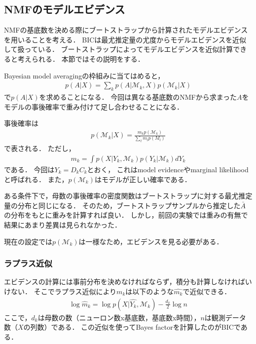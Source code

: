 \subsection{NMFのモデルエビデンス}
NMFの基底数を決める際にブートストラップから計算されたモデルエビデンスを用いることを考える．
BICは最尤推定量の尤度からモデルエビデンスを近似して扱っている．
ブートストラップによってモデルエビデンスを近似計算できると考えられる．
本節ではその説明をする．

Bayesian model averagingの枠組みに当てはめると，
\begin{eqnarray}
	p(A|X) = \sum_k p(A|\mathcal{M}_k, X) p(\mathcal{M}_k | X)
\end{eqnarray}
で$p(A|X)$を求めることになる．
今回は異なる基底数のNMFから求まった$A$をモデルの事後確率で重み付けて足し合わせることになる．

事後確率は
\begin{eqnarray}
	p(\mathcal{M}_k|X) = \frac{m_k p(\mathcal{M}_k)}{\sum_l m_l p(M_l)}
\end{eqnarray}
で表される．
ただし，
\begin{eqnarray}
	m_k = \int p(X | Y_k, \mathcal{M}_k) p(Y_k| \mathcal{M}_k) dY_k
	\label{eq:evidence}
\end{eqnarray}
である．
今回は$Y_k = D_k C_k$とおく，
これはmodel evidenceやmarginal likelihoodと呼ばれる．
また，$p(\mathcal{M}_k)$はモデルが正しい確率である．

ある条件下で，母数の事後確率の密度関数はブートストラップに対する最尤推定量の分布と同じになる．
そのため，ブートストラップサンプルから推定した$\bar A$の分布をもとに重みを計算すれば良い．
しかし，前回の実験では重みの有無で結果にあまり差異は見られなかった．

現在の設定では$p(\mathcal{M}_k)$は一様なため，エビデンスを見る必要がある．

\subsubsection{ラプラス近似}
エビデンスの計算には事前分布を決めなければならず，積分も計算しなければいけない．
そこでラプラス近似により$m_k$は以下のような$\hat{m_k}$で近似できる．
\begin{eqnarray}
	\log \hat{m}_k = \log p(X | \hat{Y_k}, \mathcal{M}_k) - \frac{d_k}{2} \log n
	\label{eq:simm}
\end{eqnarray}
ここで，$d_k$は母数の数（ニューロン数x基底数，基底数x時間），$n$は観測データ数（$X$の列数）である．
この近似を使ってBayes factorを計算したのがBICである．


